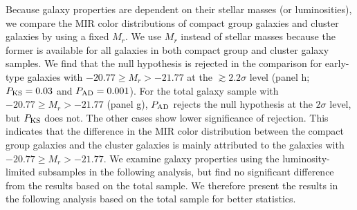 \documentclass[12pt,preprint,apj]{emulateapj}
\begin{document}
Because galaxy properties are dependent on their stellar masses (or luminosities),
we compare the MIR color distributions of compact group galaxies and 
cluster galaxies by using a fixed $M_r$. We use $M_r$ instead of stellar masses 
because the former is available for all galaxies in both compact group and cluster
galaxy samples.
We find that the null hypothesis is rejected in the comparison 
for early-type galaxies with $-20.77\geq M_r > -21.77$ at the $\gtrsim2.2\sigma$ level 
(panel h; $P_{\rm KS}=0.03$ and $P_{\rm AD}=0.001$). 
For the total galaxy sample with $-20.77\geq M_r > -21.77$ (panel g), 
$P_{\rm AD}$ rejects the null hypothesis at the $2\sigma$ level, 
but $P_{\rm KS}$ does not.
The other cases show lower significance of rejection. 
This indicates that the difference in the MIR color distribution between 
the compact group galaxies and the cluster galaxies is mainly attributed 
to the galaxies with $-20.77\geq M_r > -21.77$.
We examine galaxy properties using the luminosity-limited subsamples 
in the following analysis, but find no significant difference from the results 
based on the total sample. 
We therefore present the results in the following analysis based on the total sample 
for better statistics.

\end{document}
